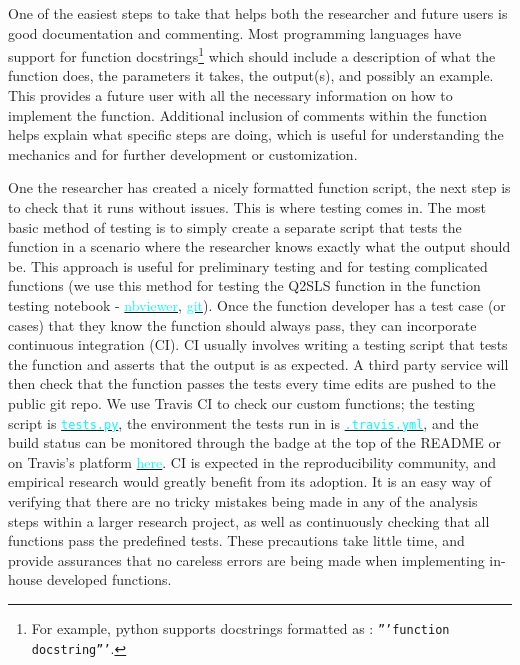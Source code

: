 \documentclass[12pt]{article}
\newcommand{\inlinecode}{\texttt}
\begin{document}
One of the easiest steps to take that helps both the researcher and future users is good documentation and commenting. Most programming languages have support for function docstrings\footnote{For example, python supports docstrings formatted as : \inlinecode{'''function docstring'''}.} which should include a description of what the function does, the parameters it takes, the output(s), and possibly an example. This provides a future user with all the necessary information on how to implement the function. Additional inclusion of comments within the function helps explain what specific steps are doing, which is useful for understanding the mechanics and for further development or customization.

One the researcher has created a nicely formatted function script, the next step is to check that it runs without issues. This is where testing comes in. The most basic method of testing is to simply create a separate script that tests the function in a scenario where the researcher knows exactly what the output should be. This approach is useful for preliminary testing and for testing complicated functions (we use this method for testing the Q2SLS function in the function testing notebook - \href{https://nbviewer.jupyter.org/github/nadavtadelis/Reproducible_Metrics/blob/master/function_testing.ipynb}{\textcolor{cyan}{nbviewer}}, \href{https://github.com/nadavtadelis/Reproducible_Metrics/blob/master/function_testing.ipynb}{\textcolor{cyan}{git}}). Once the function developer has a test case (or cases) that they know the function should always pass, they can incorporate continuous integration (CI). CI usually involves writing a testing script that tests the function and asserts that the output is as expected. A third party service will then check that the function passes the tests every time edits are pushed to the public git repo. We use Travis CI to check our custom functions; the testing script is \href{https://github.com/nadavtadelis/Reproducible_Metrics/blob/master/tests.py}{\textcolor{cyan}{\inlinecode{tests.py}}}, the environment the tests run in is \href{https://github.com/nadavtadelis/Reproducible_Metrics/blob/master/.travis.yml}{\textcolor{cyan}{\inlinecode{.travis.yml}}}, and the build status can be monitored through the badge at the top of the README or on Travis's platform \href{https://travis-ci.org/nadavtadelis/Reproducible_Metrics}{\textcolor{cyan}{here}}. CI is expected in the reproducibility community, and empirical research would greatly benefit from its adoption. It is an easy way of verifying that there are no tricky mistakes being made in any of the analysis steps within a larger research project, as well as continuously checking that all functions pass the predefined tests. These precautions take little time, and provide assurances that no careless errors are being made when implementing in-house developed functions.
\end{document}
